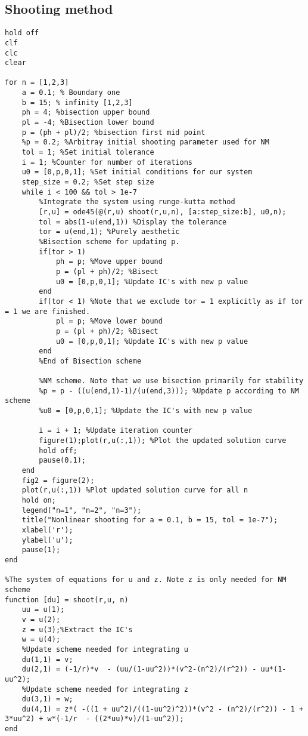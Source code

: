 \documentclass{article}
\begin{document}
\subsection{Shooting method}
\begin{lstlisting}
hold off
clf
clc
clear

for n = [1,2,3]
    a = 0.1; % Boundary one
    b = 15; % infinity [1,2,3]
    ph = 4; %bisection upper bound
    pl = -4; %Bisection lower bound
    p = (ph + pl)/2; %bisection first mid point
    %p = 0.2; %Arbitray initial shooting parameter used for NM
    tol = 1; %Set initial tolerance
    i = 1; %Counter for number of iterations
    u0 = [0,p,0,1]; %Set initial conditions for our system
    step_size = 0.2; %Set step size 
    while i < 100 && tol > 1e-7
        %Integrate the system using runge-kutta method
        [r,u] = ode45(@(r,u) shoot(r,u,n), [a:step_size:b], u0,n);
        tol = abs(1-u(end,1)) %Display the tolerance
        tor = u(end,1); %Purely aesthetic
        %Bisection scheme for updating p.
        if(tor > 1)
            ph = p; %Move upper bound
            p = (pl + ph)/2; %Bisect
            u0 = [0,p,0,1]; %Update IC's with new p value
        end
        if(tor < 1) %Note that we exclude tor = 1 explicitly as if tor = 1 we are finished.
            pl = p; %Move lower bound
            p = (pl + ph)/2; %Bisect
            u0 = [0,p,0,1]; %Update IC's with new p value
        end
        %End of Bisection scheme
        
        %NM scheme. Note that we use bisection primarily for stability
        %p = p - ((u(end,1)-1)/(u(end,3))); %Update p according to NM scheme
        %u0 = [0,p,0,1]; %Update the IC's with new p value
        
        i = i + 1; %Update iteration counter
        figure(1);plot(r,u(:,1)); %Plot the updated solution curve
        hold off;
        pause(0.1);
    end
    fig2 = figure(2);
    plot(r,u(:,1)) %Plot updated solution curve for all n
    hold on;
    legend("n=1", "n=2", "n=3");
    title("Nonlinear shooting for a = 0.1, b = 15, tol = 1e-7");
    xlabel('r');
    ylabel('u');
    pause(1);
end

%The system of equations for u and z. Note z is only needed for NM scheme
function [du] = shoot(r,u, n)
    uu = u(1);
    v = u(2);
    z = u(3);%Extract the IC's
    w = u(4);
    %Update scheme needed for integrating u
    du(1,1) = v;
    du(2,1) = (-1/r)*v  - (uu/(1-uu^2))*(v^2-(n^2)/(r^2)) - uu*(1-uu^2);
    %Update scheme needed for integrating z
    du(3,1) = w;
    du(4,1) = z*( -((1 + uu^2)/((1-uu^2)^2))*(v^2 - (n^2)/(r^2)) - 1 + 3*uu^2) + w*(-1/r  - ((2*uu)*v)/(1-uu^2));
end
\end{lstlisting}
\pagebreak
\end{document}
